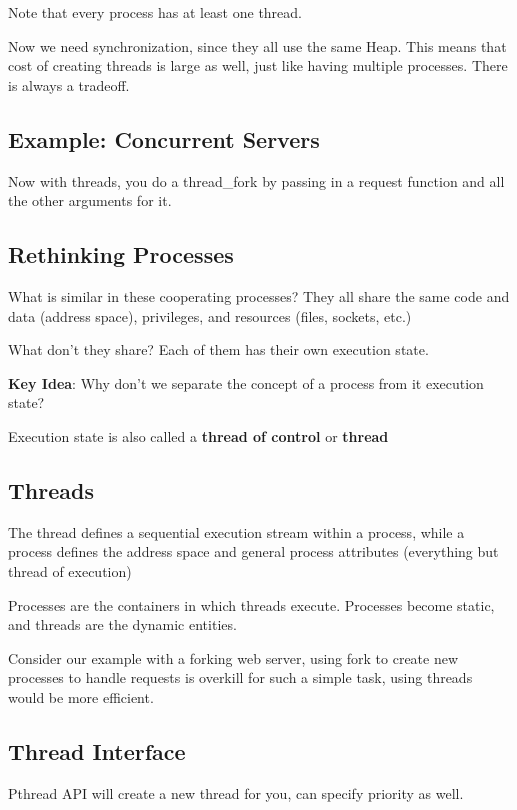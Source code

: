 \documentclass{article}
\begin{document}
Note that every process has at least one thread.

Now we need synchronization, since they all use the same Heap. This means that cost of creating threads is large as well, just like having multiple processes. There is always a tradeoff.

\subsection{Example: Concurrent Servers}

Now with threads, you do a thread\_fork by passing in a request function and all the other arguments for it.

\subsection{Rethinking Processes}

What is similar in these cooperating processes? They all share the same code and data (address space), privileges, and resources (files, sockets, etc.)

What don't they share? Each of them has their own execution state.

\textbf{Key Idea}: Why don't we separate the concept of a process from it execution state?

Execution state is also called a \textbf{thread of control} or \textbf{thread}

\subsection{Threads}

The thread defines a sequential execution stream within a process, while a process defines the address space and general process attributes (everything but thread of execution)

Processes are the containers in which threads execute. Processes become static, and threads are the dynamic entities.

Consider our example with a forking web server, using fork to create new processes to handle requests is overkill for such a simple task, using threads would be more efficient.

\subsection{Thread Interface}

Pthread API will create a new thread for you, can specify priority as well.
\end{document}

